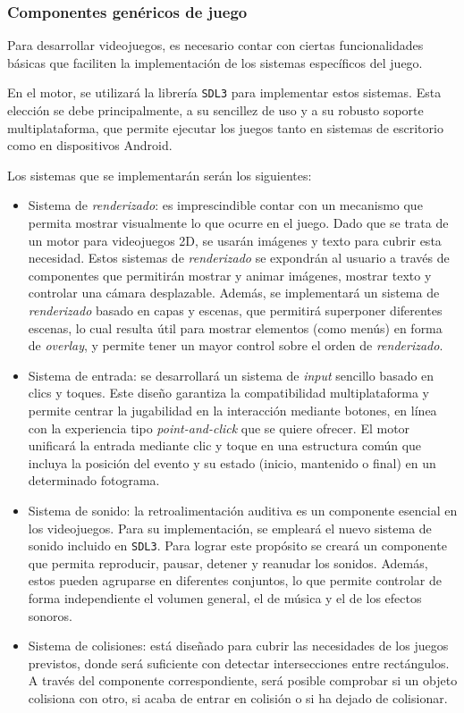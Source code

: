 \subsubsection{Componentes genéricos de juego}
Para desarrollar videojuegos, es necesario contar con ciertas funcionalidades básicas que faciliten la implementación de los sistemas específicos del juego.

\smallskip

En el motor, se utilizará la librería \texttt{SDL3} para implementar estos sistemas. Esta elección se debe principalmente, a su sencillez de uso y a su robusto soporte multiplataforma, que permite ejecutar los juegos tanto en sistemas de escritorio como en dispositivos Android.

\medskip

Los sistemas que se implementarán serán los siguientes:
\begin{itemize}
	\item Sistema de \textit{renderizado}: es imprescindible contar con un mecanismo que permita mostrar visualmente lo que ocurre en el juego. Dado que se trata de un motor para videojuegos 2D, se usarán imágenes y texto para cubrir esta necesidad. Estos sistemas de \textit{renderizado} se expondrán al usuario a través de componentes que permitirán mostrar y animar imágenes, mostrar texto y controlar una cámara desplazable. Además, se implementará un sistema de \textit{renderizado} basado en capas y escenas, que permitirá superponer diferentes escenas, lo cual resulta útil para mostrar elementos (como menús) en forma de \textit{overlay}, y permite tener un mayor control sobre el orden de \textit{renderizado}.
	\item Sistema de entrada: se desarrollará un sistema de \textit{input} sencillo basado en clics y toques. Este diseño garantiza la compatibilidad multiplataforma y permite centrar la jugabilidad en la interacción mediante botones, en línea con la experiencia tipo \textit{point-and-click} que se quiere ofrecer. El motor unificará la entrada mediante clic y toque en una estructura común que incluya la posición del evento y su estado (inicio, mantenido o final) en un determinado fotograma.
	\item Sistema de sonido: la retroalimentación auditiva es un componente esencial en los videojuegos. Para su implementación, se empleará el nuevo sistema de sonido incluido en \texttt{SDL3}. Para lograr este propósito se creará un componente que permita reproducir, pausar, detener y reanudar los sonidos. Además, estos pueden agruparse en diferentes conjuntos, lo que permite controlar de forma independiente el volumen general, el de música y el de los efectos sonoros.
	\item Sistema de colisiones: está diseñado para cubrir las necesidades de los juegos previstos, donde será suficiente con detectar intersecciones entre rectángulos. A través del componente correspondiente, será posible comprobar si un objeto colisiona con otro, si acaba de entrar en colisión o si ha dejado de colisionar.
\end{itemize}

